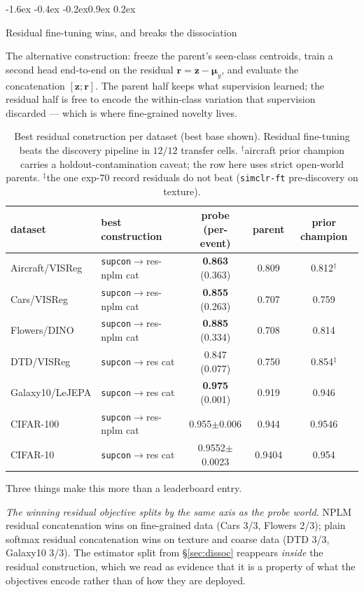 \documentclass{article}
\makeatletter
\renewcommand\subsection{\@startsection{subsection}{2}{\z@}%
  {-1.6ex \@plus -0.4ex \@minus -0.2ex}{0.9ex \@plus 0.2ex}%
  {\normalsize\bf\raggedright}}
\newcommand{\z}{\mathbf{z}}
\newcommand{\mmu}{\boldsymbol{\mu}}
\newcommand{\best}[1]{\textbf{#1}}
\makeatother
\begin{document}
\subsection{Residual fine-tuning wins, and breaks the dissociation}

The alternative construction: freeze the parent's seen-class centroids, train a
second head end-to-end on the residual $\mathbf{r}=\z-\mmu_y$, and evaluate the
concatenation $[\z;\mathbf{r}]$. The parent half keeps what supervision
learned; the residual half is free to encode the within-class variation that
supervision discarded --- which is where fine-grained novelty lives.

\begin{table}[t]\centering\small
\begin{tabular}{llccc}
\toprule
dataset & best construction & probe (per-event) & parent & prior champion \\
\midrule
Aircraft/VISReg & \texttt{supcon}$\to$res-nplm cat & \best{0.863} (0.363) & 0.809 & 0.812$^\dagger$ \\
Cars/VISReg     & \texttt{supcon}$\to$res-nplm cat & \best{0.855} (0.263) & 0.707 & 0.759 \\
Flowers/DINO    & \texttt{supcon}$\to$res-nplm cat & \best{0.885} (0.334) & 0.708 & 0.814 \\
DTD/VISReg      & \texttt{supcon}$\to$res cat      & 0.847 (0.077) & 0.750 & 0.854$^\ddagger$ \\
Galaxy10/LeJEPA & \texttt{supcon}$\to$res cat      & \best{0.975} (0.001) & 0.919 & 0.946 \\
CIFAR-100       & \texttt{supcon}$\to$res-nplm cat & 0.955$\pm$0.006 & 0.944 & 0.9546 \\
CIFAR-10        & \texttt{supcon}$\to$res cat      & 0.9552$\pm$0.0023 & 0.9404 & 0.954 \\
\bottomrule
\end{tabular}
\caption{Best residual construction per dataset (best base shown). Residual
fine-tuning beats the discovery pipeline in $12/12$ transfer cells.
$^\dagger$aircraft prior champion carries a holdout-contamination caveat; the
row here uses strict open-world parents. $^\ddagger$the one exp-70 record
residuals do not beat (\texttt{simclr-ft} pre-discovery on texture).}
\label{tab:residual}
\end{table}

Three things make this more than a leaderboard entry.

\emph{The winning residual objective splits by the same axis as the probe
world.} NPLM residual concatenation wins on fine-grained data (Cars 3/3,
Flowers 2/3); plain softmax residual concatenation wins on texture and coarse
data (DTD 3/3, Galaxy10 3/3). The estimator split from \S\ref{sec:dissoc}
reappears \emph{inside} the residual construction, which we read as evidence
that it is a property of what the objectives encode rather than of how they are
deployed.
\end{document}
